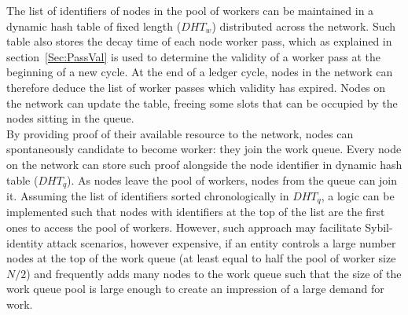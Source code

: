 The list of identifiers of nodes in the pool of workers can be maintained in a dynamic hash table of fixed length ($DHT_w$) distributed across the network. Such table also stores the decay time of each node worker pass, which as explained in section~\ref{Sec:PassVal} is used to determine the validity of a worker pass at the beginning of a new cycle. At the end of a ledger cycle, nodes in the network can therefore deduce the list of worker passes which validity has expired. Nodes on the network can update the table, freeing some slots that can be occupied by the nodes sitting in the queue. \\

By providing proof of their available resource to the network, nodes can spontaneously candidate to become worker: they join the work queue. Every node on the network can store such proof alongside the node identifier in dynamic hash table ($DHT_q$). As nodes leave the pool of workers, nodes from the queue can join it. Assuming the list of identifiers sorted chronologically in $DHT_q$, a logic can be implemented such that nodes with identifiers at the top of the list are the first ones to access the pool of workers. However, such approach may facilitate Sybil-identity attack scenarios, however expensive, if an entity controls a large number nodes at the top of the work queue (at least equal to half the pool of worker size $N/2$) and frequently adds many nodes to the work queue such that the size of the work queue pool is large enough to create an impression of a large demand for work.\\

